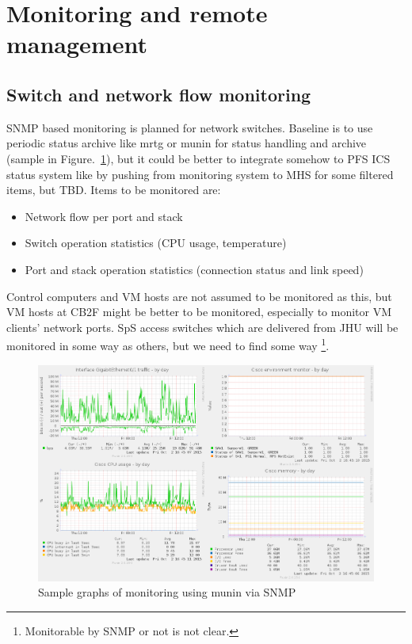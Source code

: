\documentclass[a4paper,notitlepage]{article}
\begin{document}
\section{Monitoring and remote management}

\subsection{Switch and network flow monitoring}

SNMP based monitoring is planned for network switches. 
Baseline is to use periodic status archive like mrtg or munin for status 
handling and archive (sample in Figure.~\ref{fig:network_munin}), but it could 
be better to integrate somehow to PFS ICS status system like by pushing from 
monitoring system to MHS for some filtered items, but TBD.
Items to be monitored are:

\begin{itemize}
  \item Network flow per port and stack
  \item Switch operation statistics (CPU usage, temperature)
  \item Port and stack operation statistics (connection status and link speed)
\end{itemize}

Control computers and VM hosts are not assumed to be monitored as this, but 
VM hosts at CB2F might be better to be monitored, especially to monitor VM 
clients' network ports. 
SpS access switches which are delivered from JHU will be monitored in some way 
as others, but we need to find some way
\footnote{Monitorable by SNMP or not is not clear.}.

\begin{figure}[htb]
  \begin{center}
    \includegraphics{pfs_network_munin.png}
  \end{center}
  \caption{Sample graphs of monitoring using munin via SNMP}
  \label{fig:network_munin}
\end{figure}
\end{document}
